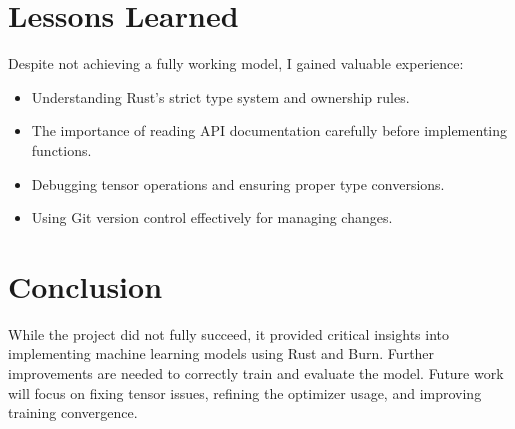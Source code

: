 \documentclass[a4paper,12pt]{article}
\begin{document}
\section{Lessons Learned}
Despite not achieving a fully working model, I gained valuable experience:
\begin{itemize}
    \item Understanding Rust's strict type system and ownership rules.
    \item The importance of reading API documentation carefully before implementing functions.
    \item Debugging tensor operations and ensuring proper type conversions.
    \item Using Git version control effectively for managing changes.
\end{itemize}

\section{Conclusion}
While the project did not fully succeed, it provided critical insights into implementing machine learning models using Rust and Burn. Further improvements are needed to correctly train and evaluate the model. Future work will focus on fixing tensor issues, refining the optimizer usage, and improving training convergence.
\end{document}
